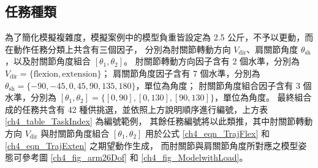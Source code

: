 \subsection{任務種類}
\begin{table}[!b]
    \caption[任務種類編號範例]{任務種類編號範例}
	\label{ch4_table_TaskIndex}
	\centering
\end{table}

為了簡化模擬複雜度，模擬案例中的模型負重皆設定為 2.5 公斤，不予以更動，而在動作任務分類上共含有三個因子，
分別為肘關節轉動方向 $V_\mathrm{dir}$、肩關節角度 $\theta_\mathrm{sh}$，以及肘關節角度組合 $[\theta_1,\theta_2]$。
肘關節轉動方向因子含有 2 個水準，分別為 $V_\mathrm{dir} = \{\text{flexion}, \text{extension}\}$；
肩關節角度因子含有 7 個水準，分別為 $\theta_\mathrm{sh} = \{-90,-45,0,45,90,135,180\}$，單位為角度；
肘關節角度組合因子含有 3 個水準，分別為 $[\theta_1, \theta_2] = \{[0,90],[0,130],[90,130]\}$，單位為角度。
最終組合成的任務共含有 42 種供挑選，並依照上方說明順序進行編號，上方表 \ref{ch4_table_TaskIndex} 為編號範例，
其餘任務編號將以此類推，其中肘關節轉動方向 $V_\mathrm{dir}$ 與肘關節角度組合 $[\theta_1,\theta_2]$ 用於公式 \ref{ch4_eqn_TrajFlex} 和 \ref{ch4_eqn_TrajExten} 之期望動作生成，
而肘關節與肩關節角度所對應之模型姿態可參考圖 \ref{ch4_fig_arm26Dof} 和 \ref{ch4_fig_ModelwithLoad}。

